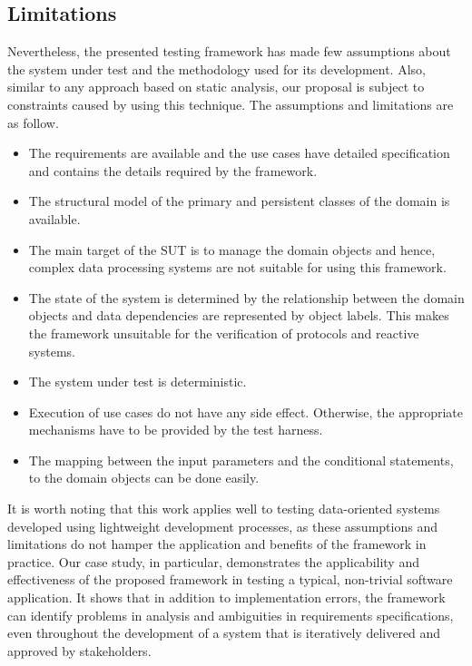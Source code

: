 \subsection{Limitations}
\label{sec:discussion-limitations}
Nevertheless, the presented testing framework has made few assumptions about the system under test and the methodology used for its development. Also, similar to any approach based on static analysis, our proposal is subject to constraints caused by using this technique. The assumptions and limitations are as follow.

\begin{itemize}
	\item The requirements are available and the use cases have detailed specification and contains the details required by the framework.
	
	\item The structural model of the primary and persistent classes of the domain is available.
	
	\item  The main target of the SUT is to manage the domain objects and hence, complex data processing systems are not suitable for using this framework.
	
	\item The state of the system is determined by the relationship between the domain objects and data dependencies are represented by object labels. This makes the framework unsuitable for the verification of protocols and reactive systems. 
	
	\item The system under test is deterministic.
	
	\item Execution of use cases do not have any side effect. Otherwise, the appropriate mechanisms have to be provided by the test harness.
	
	\item The mapping between the input parameters and the conditional statements, to the domain objects can be done easily.
\end{itemize}

It is worth noting that this work applies well to testing data-oriented systems developed using lightweight development processes, as these assumptions and limitations do not hamper the application and benefits of the framework in practice. Our case study, in particular, demonstrates the applicability and effectiveness of the proposed framework in testing a typical, non-trivial software application. It shows that in addition to implementation errors, the framework can identify problems in analysis and ambiguities in requirements specifications, even throughout the development of a system that is iteratively delivered and approved by stakeholders.